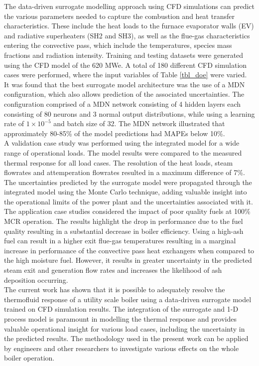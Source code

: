 \documentclass[a4paper,fleqn]{cas-sc}
\begin{document}
The data-driven surrogate modelling approach using CFD simulations can predict the various parameters needed to capture the combustion and heat transfer characteristics. These include the heat loads to the furnace evaporator walls (EV) and radiative superheaters (SH2 and SH3), as well as the flue-gas characteristics entering the convective pass, which include the temperatures, species mass fractions and radiation intensity. Training and testing datasets were generated using the CFD model of the 620 MWe. A total of 180 different CFD simulation cases were performed, where the input variables of Table \ref{tbl_doe} were varied.\\

It was found that the best surrogate model architecture was the use of a MDN configuration, which also allows prediction of the associated uncertainties. The configuration comprised of a MDN network consisting of 4 hidden layers each consisting of 80 neurons and 3 normal output distributions, while using a learning rate of $1\times10^{-5}$ and batch size of 32. The MDN network illustrated that approximately 80-85\% of the model predictions had MAPEs below 10\%.\\

A validation case study was performed using the integrated model for a wide range of operational loads. The model results were compared to the measured thermal response for all load cases. The resolution of the heat loads, steam flowrates and attemperation flowrates resulted in a maximum difference of 7\%. The uncertainties predicted by the surrogate model were propagated through the integrated model using the Monte Carlo technique, adding valuable insight into the operational limits of the power plant and the uncertainties associated with it.\\

The application case studies considered the impact of poor quality fuels at 100\% MCR operation. The results highlight the drop in performance due to the fuel quality resulting in a substantial decrease in boiler efficiency. Using a high-ash fuel can result in a higher exit flue-gas temperatures resulting in a marginal increase in performance of the convective pass heat exchangers when compared to the high moisture fuel. However, it results in greater uncertainty in the predicted steam exit and generation flow rates and increases the likelihood of ash deposition occurring.\\ 

The current work has shown that it is possible to adequately resolve the thermofluid response of a utility scale boiler using a data-driven surrogate model trained on CFD simulation results. The integration of the surrogate and 1-D process model is paramount in modelling the thermal response and provides valuable operational insight for various load cases, including the uncertainty in the predicted results. The methodology used in the present work can be applied by engineers and other researchers to investigate various effects on the whole boiler operation.
\printcredits
%
%



\end{document}
